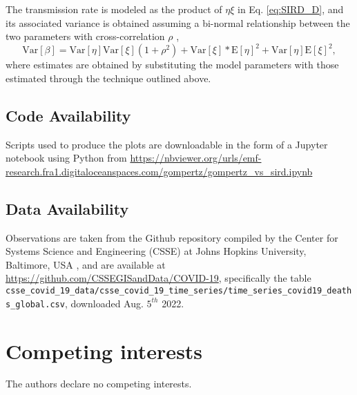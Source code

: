 \documentclass{article}
\begin{document}

The transmission rate is modeled as the product of $\eta \xi$ in Eq. \ref{eq:SIRD_D}, and its associated variance is obtained assuming a bi-normal relationship between the two parameters with cross-correlation $\rho$ \cite{nadarajah2016distribution},
\begin{equation}
\text{Var}[\beta] = \text{Var}[\eta] \text{Var}[\xi] (1 + \rho^2) + \text{Var}[\xi]*\text{E}[\eta]^2 + \text{Var}[\eta] \text{E}[\xi]^2,
\end{equation}
where estimates are obtained by substituting the model parameters with those estimated through the technique outlined above.

\subsection*{Code Availability}

Scripts used to produce the plots are downloadable in the form of a Jupyter notebook using Python from 
\newline
\url{https://nbviewer.org/urls/emf-research.fra1.digitaloceanspaces.com/gompertz/gompertz_vs_sird.ipynb}

\subsection*{Data Availability}
Observations are taken from the Github repository compiled by the Center for Systems Science and Engineering (CSSE) at Johns Hopkins University, Baltimore,
USA \cite{dong2020interactive}, and are available at \url{https://github.com/CSSEGISandData/COVID-19}, specifically the table \newline\verb|csse_covid_19_data/csse_covid_19_time_series/time_series_covid19_deaths_global.csv|, \newline downloaded Aug. $5^{th}$ 2022.

\section*{Competing interests}
The authors declare no competing interests.
\end{document}
